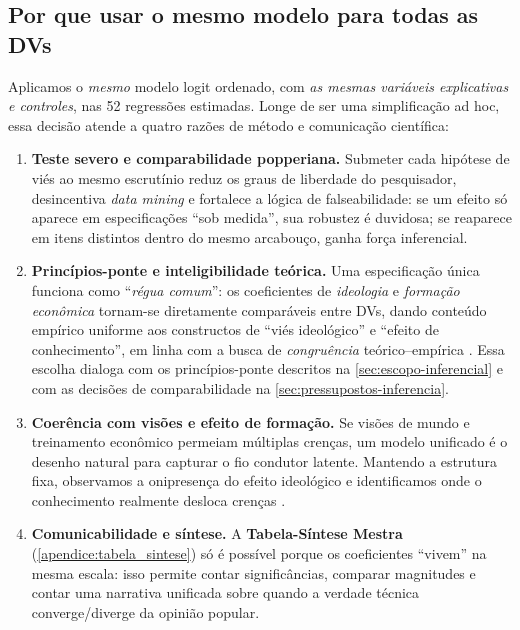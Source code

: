 \subsection{Por que usar o mesmo modelo para todas as DVs}\label{sec:modelo-unico}
Aplicamos o \emph{mesmo} modelo logit ordenado, com \emph{as mesmas variáveis explicativas e controles}, nas 52 regressões estimadas. Longe de ser uma simplificação ad hoc, essa decisão atende a quatro razões de método e comunicação científica:

\begin{enumerate}[label=\roman*)]
\item \textbf{Teste severo e comparabilidade popperiana.} Submeter cada hipótese de viés ao mesmo escrutínio reduz os graus de liberdade do pesquisador, desincentiva \emph{data mining} e fortalece a lógica de falseabilidade: se um efeito só aparece em especificações “sob medida”, sua robustez é duvidosa; se reaparece em itens distintos dentro do mesmo arcabouço, ganha força inferencial.

\item \textbf{Princípios-ponte e inteligibilidade teórica.} Uma especificação única funciona como “\emph{régua comum}”: os coeficientes de \emph{ideologia} e \emph{formação econômica} tornam-se diretamente comparáveis entre DVs, dando conteúdo empírico uniforme aos constructos de “viés ideológico” e “efeito de conhecimento”, em linha com a busca de \emph{congruência} teórico–empírica \cite{stigum2003}. Essa escolha dialoga com os princípios-ponte descritos na \autoref{sec:escopo-inferencial} e com as decisões de comparabilidade na \autoref{sec:pressupostos-inferencia}.

\item \textbf{Coerência com visões e efeito de formação.} Se visões de mundo e treinamento econômico permeiam múltiplas crenças, um modelo unificado é o desenho natural para capturar o fio condutor latente. Mantendo a estrutura fixa, observamos a onipresença do efeito ideológico e identificamos onde o conhecimento realmente desloca crenças \cite{sowell2007conflict,newman2020ideia}. 

\item \textbf{Comunicabilidade e síntese.} A \textbf{Tabela-Síntese Mestra} (\autoref{apendice:tabela_sintese}) só é possível porque os coeficientes “vivem” na mesma escala: isso permite contar significâncias, comparar magnitudes e contar uma narrativa unificada sobre quando a verdade técnica converge/diverge da opinião popular.
\end{enumerate}

